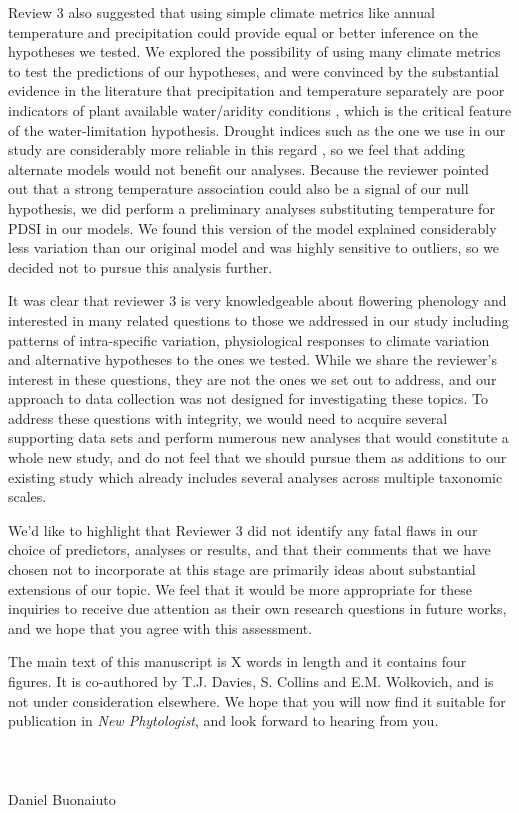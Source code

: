 \documentclass{article}[12pt]
\begin{document}
Review 3 also suggested that using simple climate metrics like annual temperature and precipitation could provide equal or better inference on the hypotheses we tested. We explored the possibility of using many climate metrics to test the predictions of our hypotheses, and were convinced by the substantial evidence in the literature that precipitation and temperature separately are poor indicators of plant available water/aridity conditions \citep{Moles_2014,Piedallu_2013,Hickler_2009}, which is the critical feature of the water-limitation hypothesis. Drought indices such as the one we use in our study are considerably more reliable in this regard \citep{Moles_2014,Dai:2004aa,MIKA2005223}, so we feel that adding alternate models would not benefit our analyses. Because the reviewer pointed out that a strong temperature association could also be a signal of our null hypothesis, we did perform a preliminary analyses substituting temperature for PDSI in our models. We found this version of the model explained considerably less variation than our original model and was highly sensitive to outliers, so we decided not to pursue this analysis further.

It was clear that reviewer 3 is very knowledgeable about flowering phenology and interested in many related questions to those we addressed in our study including patterns of intra-specific variation, physiological responses to climate variation and alternative hypotheses to the ones we tested. While we share the reviewer's interest in these questions, they are not the ones we set out to address, and our approach to data collection was not designed for investigating these topics. To address these questions with integrity, we would need to acquire several supporting data sets and perform numerous new analyses that would constitute a whole new study, and do not feel that we should pursue them as additions to our existing study which already includes several analyses across multiple taxonomic scales. 

We'd like to highlight that Reviewer 3 did not identify any fatal flaws in our choice of predictors, analyses or results, and that their comments that we have chosen not to incorporate at this stage are primarily ideas about substantial extensions of our topic. We feel that it would be more appropriate for these inquiries to receive due attention as their own research questions in future works, and we hope that you agree with this assessment.

The main text of this manuscript is X words in length and it contains four figures. It is co-authored by T.J. Davies, S. Collins and E.M. Wolkovich, and is not under consideration elsewhere. We hope that you will now find it suitable for publication in \emph{New Phytologist}, and look forward to hearing from you.\\\\\\\\

\noindent Daniel Buonaiuto\\

 
\end{document}
